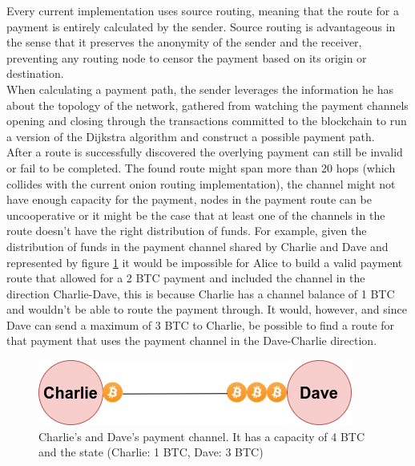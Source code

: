 Every current implementation uses source routing, meaning that the route for a payment is entirely calculated by the sender. Source routing is advantageous in the sense that it preserves the anonymity of the sender and the receiver, preventing any routing node to censor the payment based on its origin or destination.\\
When calculating a payment path, the sender leverages the information he has about the topology of the network, gathered from watching the payment channels opening and closing through the transactions committed to the blockchain to run a version of the Dijkstra algorithm and construct a possible payment path. \\
After a route is successfully discovered the overlying payment can still be invalid or fail to be completed. The found route might span more than 20 hops (which collides with the current onion routing implementation), the channel might not have enough capacity for the payment, nodes in the payment route can be uncooperative or it might be the case that at least one of the channels in the route doesn't have the right distribution of funds. For example, given the distribution of funds in the payment channel shared by Charlie and Dave and represented by figure \ref{fig:payment_channel} it would be impossible for Alice to build a valid payment route that allowed for a 2 BTC payment and included the channel in the direction Charlie-Dave, this is because Charlie has a channel balance of 1 BTC and wouldn't be able to route the payment through. It would, however, and since Dave can send a maximum of 3 BTC to Charlie, be possible to find a route for that payment that uses the payment channel in the Dave-Charlie direction. 

\begin{figure}[H]
\begin{center}
  \includegraphics[width=0.6\linewidth]{images/payment_channel.png}
  \caption{Charlie's and Dave's payment channel. It has a capacity of 4 BTC and the state
(Charlie: 1 BTC, Dave: 3 BTC)}
  \label{fig:payment_channel}
  \end{center}
\end{figure}

